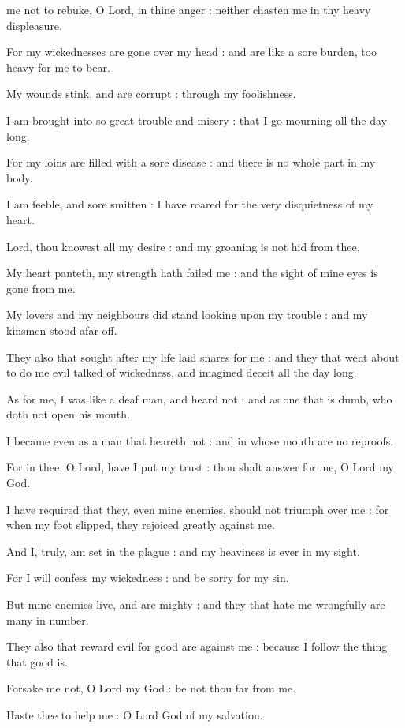  me not to rebuke, O Lord, in thine anger : neither chasten me in thy heavy displeasure.\par
{}
For my wickednesses are gone over my head : and are like a sore burden, too heavy for me to bear.\par
{}My wounds stink, and are corrupt : through my foolishness.\par
{}I am brought into so great trouble and misery : that I go mourning all the day long.\par
{}For my loins are filled with a sore disease : and there is no whole part in my body.\par
{}I am feeble, and sore smitten : I have roared for the very disquietness of my heart.\par
{}Lord, thou knowest all my desire : and my groaning is not hid from thee.\par
{}My heart panteth, my strength hath failed me : and the sight of mine eyes is gone from me.\par
{}My lovers and my neighbours did stand looking upon my trouble : and my kinsmen stood afar off.\par
{}They also that sought after my life laid snares for me : and they that went about to do me evil talked of wickedness, and imagined deceit all the day long.\par
{}As for me, I was like a deaf man, and heard not : and as one that is dumb, who doth not open his mouth.\par
{}I became even as a man that heareth not : and in whose mouth are no reproofs.\par
{}For in thee, O Lord, have I put my trust : thou shalt answer for me, O Lord my God.\par
{}I have required that they, even mine enemies, should not triumph over me : for when my foot slipped, they rejoiced greatly against me.\par
{}And I, truly, am set in the plague : and my heaviness is ever in my sight.\par
{}For I will confess my wickedness : and be sorry for my sin.\par
{}But mine enemies live, and are mighty : and they that hate me wrongfully are many in number.\par
{}They also that reward evil for good are against me : because I follow the thing that good is.\par
{}Forsake me not, O Lord my God : be not thou far from me.\par
{}Haste thee to help me : O Lord God of my salvation.\par

